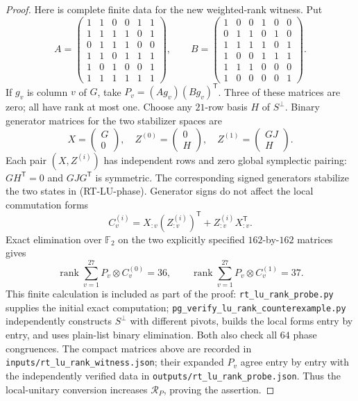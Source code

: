 \begin{proof}
Here is complete finite data for the new weighted-rank witness. Put
\[
 A=\begin{pmatrix}
1&1&0&0&1&1\\1&1&1&1&0&1\\0&1&1&1&0&0\\
1&1&0&1&1&1\\1&0&1&0&0&1\\1&1&1&1&1&1
\end{pmatrix},\qquad
 B=\begin{pmatrix}
1&0&0&1&0&0\\0&1&1&0&1&0\\1&1&1&1&0&1\\
1&0&0&1&1&1\\1&1&1&0&0&0\\1&0&0&0&0&1
\end{pmatrix}.
\]
If $g_v$ is column $v$ of $G$, take
$P_v=(Ag_v)(Bg_v)^{\mathsf T}$. Three of these matrices are zero;
all have rank at most one. Choose any $21$-row basis $H$ of
$S^\perp$. Binary generator matrices for the two stabilizer spaces are
\[
 X=\begin{pmatrix}G\\0\end{pmatrix},\quad
 Z^{(0)}=\begin{pmatrix}0\\H\end{pmatrix},\quad
 Z^{(1)}=\begin{pmatrix}GJ\\H\end{pmatrix}.
\]
Each pair $(X,Z^{(i)})$ has independent rows and zero global
symplectic pairing: $GH^{\mathsf T}=0$ and $GJG^{\mathsf T}$ is
symmetric. The corresponding signed generators stabilize the two
states in (RT-LU-phase). Generator signs do not affect the local
commutation forms
\[
 C_v^{(i)}=X_{:v}(Z^{(i)}_{:v})^{\mathsf T}
             +Z^{(i)}_{:v}X_{:v}^{\mathsf T}.
\]
Exact elimination over $\mathbb F_2$ on the two explicitly specified
$162$-by-$162$ matrices gives
\[
 \operatorname{rank}\sum_{v=1}^{27}P_v\otimes C_v^{(0)}=36,
 \qquad
 \operatorname{rank}\sum_{v=1}^{27}P_v\otimes C_v^{(1)}=37.
 \tag{RT-LU-ranks}
\]
This finite calculation is included as part of the proof:
\texttt{rt\_lu\_rank\_probe.py} supplies the initial exact computation;
\texttt{pg\_verify\_lu\_rank\_counterexample.py} independently constructs
$S^\perp$ with different pivots, builds the local forms entry by entry,
and uses plain-list binary elimination. Both also check all $64$
phase congruences. The compact matrices above are recorded in
\texttt{inputs/rt\_lu\_rank\_witness.json}; their expanded $P_v$ agree
entry by entry with the independently verified data in
\texttt{outputs/rt\_lu\_rank\_probe.json}. Thus the local-unitary
conversion increases $\mathcal R_P$, proving the assertion.
\end{proof}

